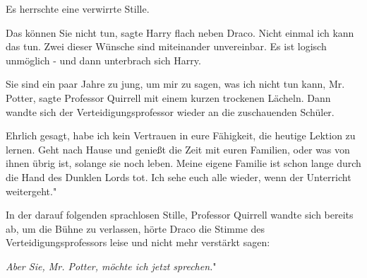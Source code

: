 Es herrschte eine verwirrte Stille.

\glqq{}Das können Sie nicht tun\grqq{}, sagte Harry flach neben Draco. \glqq
Nicht einmal ich kann das tun. Zwei dieser Wünsche sind miteinander unvereinbar.
Es ist logisch unmöglich -\grqq{} und dann unterbrach sich Harry.

\glqq{}Sie sind ein paar Jahre zu jung, um mir zu sagen, was ich nicht tun kann,
Mr. Potter\grqq{}, sagte Professor Quirrell mit einem kurzen trockenen Lächeln.
Dann wandte sich der Verteidigungsprofessor wieder an die zuschauenden Schüler.

\glqq{}Ehrlich gesagt, habe ich kein Vertrauen in eure Fähigkeit, die heutige
Lektion zu lernen. Geht nach Hause und genießt die Zeit mit euren Familien, oder
was von ihnen übrig ist, solange sie noch leben. Meine eigene Familie ist schon
lange durch die Hand des Dunklen Lords tot. Ich sehe euch alle wieder, wenn der
Unterricht weitergeht."

In der darauf folgenden sprachlosen Stille, Professor Quirrell wandte sich
bereits ab, um die Bühne zu verlassen, hörte Draco die Stimme des
Verteidigungsprofessors leise und nicht mehr verstärkt sagen:

\glqq{}\emph{Aber Sie, Mr. Potter, möchte ich jetzt sprechen.}"

